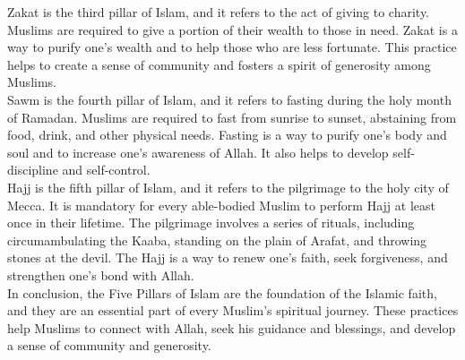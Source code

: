 \documentclass[11pt]{article}
\begin{document}
Zakat is the third pillar of Islam, and it refers to the act of giving to charity. Muslims are required to give a portion of their wealth to those in need. Zakat is a way to purify one's wealth and to help those who are less fortunate. This practice helps to create a sense of community and fosters a spirit of generosity among Muslims.\\

Sawm is the fourth pillar of Islam, and it refers to fasting during the holy month of Ramadan. Muslims are required to fast from sunrise to sunset, abstaining from food, drink, and other physical needs. Fasting is a way to purify one's body and soul and to increase one's awareness of Allah. It also helps to develop self-discipline and self-control.\\

Hajj is the fifth pillar of Islam, and it refers to the pilgrimage to the holy city of Mecca. It is mandatory for every able-bodied Muslim to perform Hajj at least once in their lifetime. The pilgrimage involves a series of rituals, including circumambulating the Kaaba, standing on the plain of Arafat, and throwing stones at the devil. The Hajj is a way to renew one's faith, seek forgiveness, and strengthen one's bond with Allah.\\

In conclusion, the Five Pillars of Islam are the foundation of the Islamic faith, and they are an essential part of every Muslim's spiritual journey. These practices help Muslims to connect with Allah, seek his guidance and blessings, and develop a sense of community and generosity.
\end{document}
